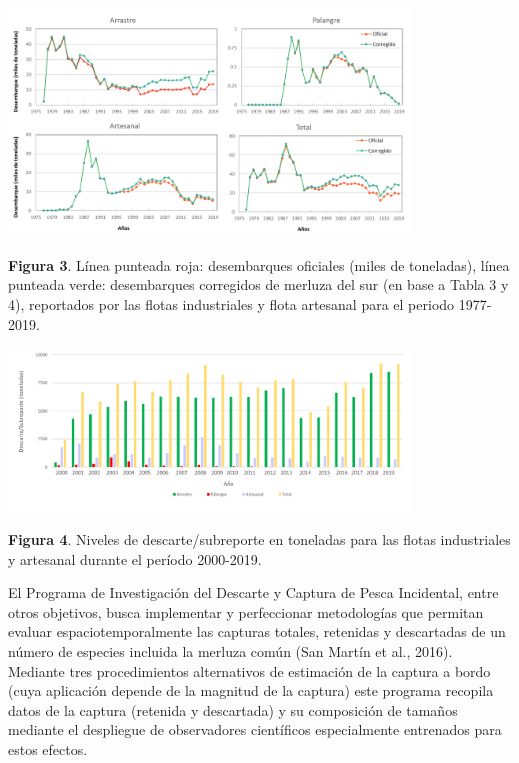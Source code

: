 \documentclass[
  spanish,
]{article}
\begin{document}
\begin{center}
\includegraphics[width=0.8\textwidth]{Figuras/Figura_3.png}
\end{center}

\small \textbf{Figura 3}. Línea punteada roja: desembarques oficiales
(miles de toneladas), línea punteada verde: desembarques corregidos de
merluza del sur (en base a Tabla 3 y 4), reportados por las flotas
industriales y flota artesanal para el periodo 1977-2019. \vspace{0.5cm}
\normalsize

\begin{center}
\includegraphics[width=0.8\textwidth]{Figuras/Figura_4.png}
\end{center}

\small \textbf{Figura 4}. Niveles de descarte/subreporte en toneladas
para las flotas industriales y artesanal durante el período 2000-2019.
\vspace{0.5cm} \normalsize

El Programa de Investigación del Descarte y Captura de Pesca Incidental,
entre otros objetivos, busca implementar y perfeccionar metodologías que
permitan evaluar espaciotemporalmente las capturas totales, retenidas y
descartadas de un número de especies incluida la merluza común (San
Martín et al., 2016). Mediante tres procedimientos alternativos de
estimación de la captura a bordo (cuya aplicación depende de la magnitud
de la captura) este programa recopila datos de la captura (retenida y
descartada) y su composición de tamaños mediante el despliegue de
observadores científicos especialmente entrenados para estos efectos.
\end{document}
